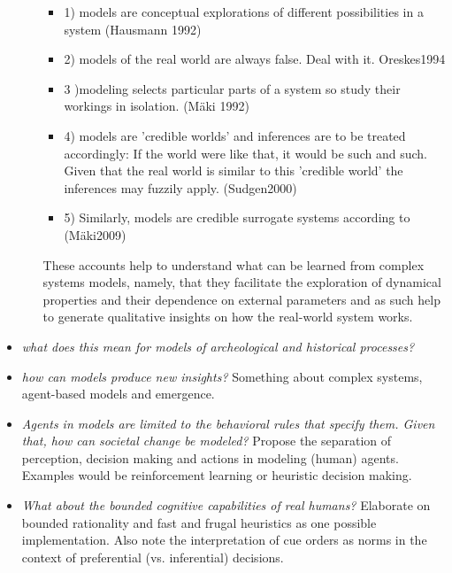 \begin{itemize}
\begin{itemize}
    \begin{itemize}
    \item 1) models are conceptual explorations of different possibilities in a system (Hausmann 1992)
    \item 2) models of the real world are always false. Deal with it. Oreskes1994
    \item 3 )modeling selects particular parts of a system so study their workings in isolation. (M\"{a}ki 1992)
    \item 4) models are 'credible worlds' and inferences are to be treated accordingly: If the world were like that, it would be such and such. Given that the real world is similar to this 'credible world' the inferences may fuzzily apply. (Sudgen2000)
  \item 5) Similarly, models are credible surrogate systems according to (M\"{a}ki2009)
    \end{itemize}
    These accounts help to understand what can be learned from complex systems models, namely, that they facilitate the exploration of dynamical properties and their dependence on external parameters and as such help to generate qualitative insights on how the real-world system works.
 \end{itemize}
\item \emph{what does this mean for models of archeological and historical processes?}

\item \emph{how can models produce new insights?} Something about complex systems, agent-based models and emergence.

\item \emph{Agents in models are limited to the behavioral rules that specify them. Given that, how can societal change be modeled?} Propose the separation of perception, decision making and actions in modeling (human) agents. Examples would be reinforcement learning or heuristic decision making.

\item \emph{What about the bounded cognitive capabilities of real humans?} Elaborate on bounded rationality and fast and frugal heuristics as one possible implementation. Also note the interpretation of cue orders as norms in the context of preferential (vs. inferential) decisions.

\end{itemize}

